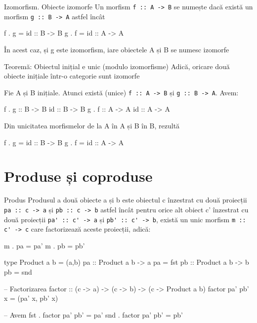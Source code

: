 \documentclass[xcolor=pdftex,romanian,colorlinks]{beamer}
\begin{document}
\begin{frame}[fragile]{Izomorfism. Obiecte izomorfe}
Un morfism \lstinline$f :: A -> B$ se numește 
dacă există un morfism \lstinline$g :: B -> A$ astfel încât
\vspace{-1ex}
\begin{asciihs}
f . g = id :: B -> B
g . f = id :: A -> A
\end{asciihs}
În acest caz, și g este izomorfism, iare obiectele A și B se numesc izomorfe


\begin{block}{Teoremă: Obiectul inițial e unic (modulo izomorfisme)}
Adică, oricare două obiecte inițiale într-o categorie sunt izomorfe

Fie A și B inițiale.  Atunci există (unice) \lstinline$f :: A -> B$ și \lstinline$g :: B -> A$. Avem:
\vspace{-1ex}
\begin{asciihs}
f . g :: B -> B                             id :: B -> B
g . f :: A -> A                             id :: A -> A
\end{asciihs}
Din unicitatea morfismelor de la A în A și B în B, rezultă
\vspace{-1ex}
\begin{asciihs}
f . g = id :: B -> B
g . f = id :: A -> A
\end{asciihs}
\end{block}

\end{frame}

\section{Produse și coproduse}


\begin{frame}[fragile]{Produs}
Produsul a două obiecte a și b este obiectul c înzestrat cu două proiecții 
\lstinline$pa :: c -> a$ și \lstinline$pb :: c -> b$ astfel încât pentru orice alt obiect c' înzestrat cu două proiecții \lstinline$pa' :: c' -> a$ și \lstinline$pb' :: c' -> b$, există un unic morfism \lstinline$m :: c' -> c$ care factorizează aceste proiecții, adică:
\vspace{-1ex}
\begin{asciihs}
m . pa = pa'                                   m . pb = pb'

type Product a b = (a,b)
pa :: Product a b -> a
pa = fst
pb :: Product a b -> b
pb = snd

-- Factorizarea
factor  :: (c -> a) -> (c -> b) -> (c -> Product a b)
factor pa' pb' x = (pa' x, pb' x)

-- Avem
fst . factor pa' pb' = pa'        snd . factor pa' pb' = pb'
\end{asciihs}
\end{frame}
\end{document}
